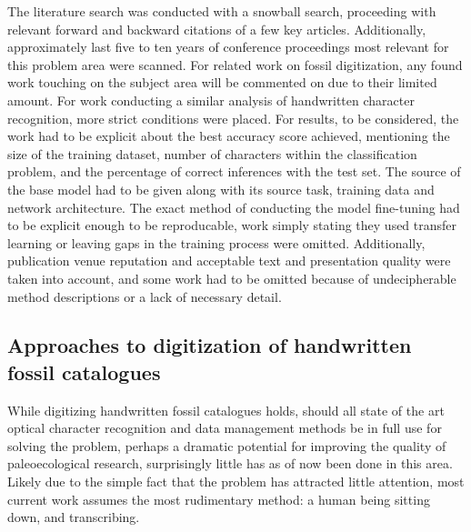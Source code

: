 \documentclass{article}
\begin{document}

The literature search was conducted with a snowball search, proceeding with relevant forward and backward citations 
of a few key articles. Additionally, approximately last five to ten years of conference proceedings most relevant for this problem area were 
scanned. For related work on fossil digitization, any found work touching on the subject area will be commented on due to their 
limited amount. For work conducting a similar analysis of handwritten character recognition, more strict conditions were placed. 
For results, to be considered, the work had to be explicit about the best accuracy score achieved,
mentioning the size of the training dataset, number of characters within the classification problem, and the percentage 
of correct inferences with the test set. The source of the base model had to be given along with its source task, training data
and network architecture. The exact method of conducting the model fine-tuning had to be explicit enough to be reproducable,
work simply stating they used transfer learning or leaving gaps in the training process were omitted. Additionally, 
publication venue reputation and acceptable text and presentation quality were taken into account, and some work had to be
omitted because of undecipherable method descriptions or a lack of necessary detail.


\subsection{Approaches to digitization of handwritten fossil catalogues}
\label{sect:related_same_problem}

While digitizing handwritten fossil catalogues holds,
should all state of the art optical character recognition and data management methods 
be in full use for solving the problem, perhaps a dramatic potential for improving 
the quality of paleoecological research, surprisingly little has as of now been done in this area.
Likely due to the simple fact that the problem has attracted little attention, 
most current work assumes the most rudimentary method: a human 
being sitting down, and transcribing.
\end{document}
